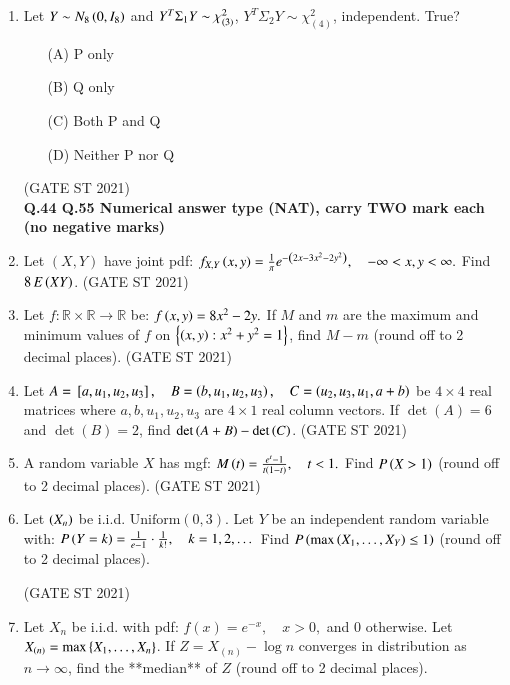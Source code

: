 \documentclass[journal,12pt,onecolumn]{IEEEtran}
\theoremstyle{remark}
\begin{document}
\begin{enumerate}
\item
Let $Y \sim N_8\left(0,I_8\right)$ and $Y^T\Sigma_1Y \sim \chi^2_{\left(3\right)}$, $Y^T\Sigma_2Y \sim \chi^2_{(4)}$, independent. True?
\begin{enumerate}
\item[(A)] P only
\item[(B)] Q only
\item[(C)] Both P and Q
\item[(D)] Neither P nor Q
\end{enumerate}
\hfill (GATE ST 2021) \\

\textbf{Q.44 \text{-} Q.55 Numerical answer type   (NAT), carry TWO mark each (no negative marks)}
\item
Let $(X,Y)$ have joint pdf:
$
f_{X,Y}\left(x,y\right) = \frac{1}{\pi} e^{-\left(2x - 3x^2 - 2y^2\right)}, \quad -\infty < x,y < \infty.
$
Find $8 \, E\left(XY\right)$.
\hfill (GATE ST 2021) \\

\item
Let $f: \mathbb{R} \times \mathbb{R} \to \mathbb{R}$ be:
$
f\left(x,y\right)= 8x^2 - 2y.
$
If $M$ and $m$ are the maximum and minimum values of $f$ on $\left\{ \left(x,y\right) : x^2 + y^2 = 1 \right\}$,  
find $M - m$ (round off to 2 decimal places).
\hfill (GATE ST 2021) \\


\item
Let 
$
A = {}\left[a, u_1, u_2, u_3\right], \quad
B = \left(b, u_1, u_2, u_3\right), \quad
C = \left(u_2, u_3, u_1, a+b\right)
$
be $4\times 4$ real matrices where $a,b,u_1,u_2,u_3$ are $4 \times 1$ real column vectors.  
If $\det(A) = 6$ and $\det(B) = 2$, find $\det\left(A+B\right) - \det\left(C\right)$.
\hfill (GATE ST 2021) \\
\item
A random variable $X$ has mgf:
$
M\left(t\right) = \frac{e^t - 1}{t\left(1-t\right)}, \quad t < 1.
$
Find $P\left(X > 1\right)$ (round off to 2 decimal places).
\hfill (GATE ST 2021) \\
\item
Let $\left( X_n \right)$ be i.i.d. $\text{Uniform}(0,3)$.  
Let $Y$ be an independent random variable with:
$
P\left(Y = k\right) = \frac{1}{e-1} \cdot \frac{1}{k!}, \quad k = 1,2,\dots
$
Find $P\left( \max\left( X_1,\dots,X_Y \right) \le 1 \right)$ (round off to 2 decimal places).

\hfill (GATE ST 2021) \\


\item
Let  $X_n$ be i.i.d. with pdf:
$
f(x) = e^{-x}, \quad x > 0,
$
and $0$ otherwise.  
Let $X_{(n)} = \max\left\{ X_1,\dots,X_n \right\}$. If 
$
Z = X_{(n)} - \log n
$
converges in distribution as $n \to \infty$, find the **median** of $Z$ (round off to 2 decimal places).


\end{enumerate}
\end{document}
